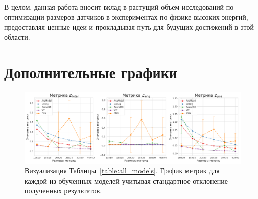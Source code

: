 \documentclass[a4paper,12pt]{extarticle}
\begin{document}
В целом, данная работа вносит вклад в растущий объем исследований по оптимизации размеров датчиков в экспериментах по физике высоких энергий, предоставляя ценные идеи и прокладывая путь для будущих достижений в этой области.

\newpage 
\printbibliography[heading=bibintoc] 


\newpage
\appendix

\section{Дополнительные графики}

\begin{figure}[ht]
    \centering
    \includegraphics[width=1.0\textwidth]{graphics/models_comp_extra.png}
    \caption{Визуализация Таблицы~\ref{table:all_models}. График метрик для каждой из обученных моделей учитывая стандартное отклонение полученных результатов.}
    \label{graph:all_models_extra}
\end{figure}
\end{document}
